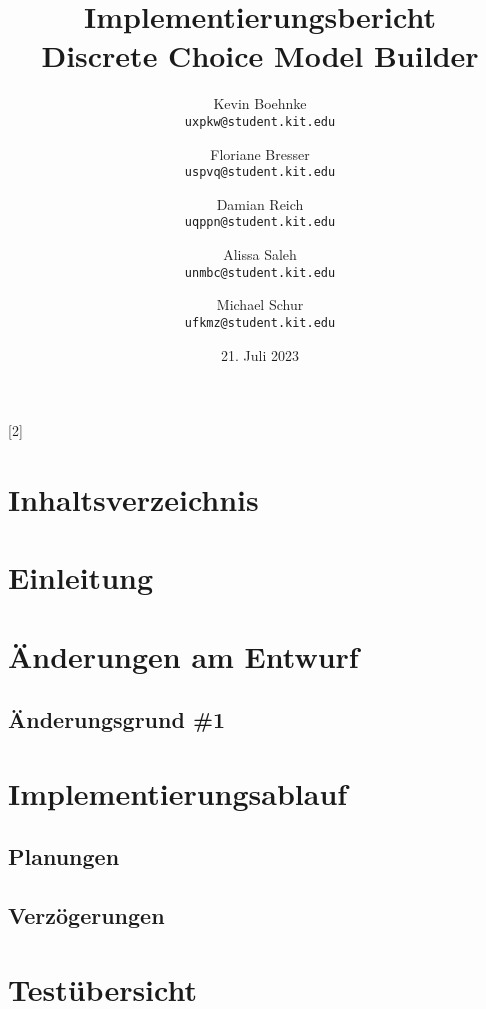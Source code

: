 \documentclass{article}
\title{Implementierungsbericht \\ \large Discrete Choice Model Builder}
\author{Kevin Boehnke \\ \texttt{uxpkw@student.kit.edu}
\and Floriane Bresser \\ \texttt{uspvq@student.kit.edu}
\and Damian Reich \\ \texttt{uqppn@student.kit.edu}
\and Alissa Saleh \\ \texttt{unmbc@student.kit.edu}
\and Michael Schur \\ \texttt{ufkmz@student.kit.edu}}
\date{21. Juli 2023}
\begin{document}
\maketitle
\thispagestyle{empty}
\newpage
\startcontents[maintableofcontents]
[2]{\section*{Inhaltsverzeichnis}}
\thispagestyle{empty}
\newpage
{}

\section{Einleitung}



\section{Änderungen am Entwurf}


\subsection{Änderungsgrund \#1}

\section{Implementierungsablauf}

\subsection{Planungen}


\subsection{Verzögerungen}



\section{Testübersicht}



\clearpage
\printunsrtglossary
\end{document}
